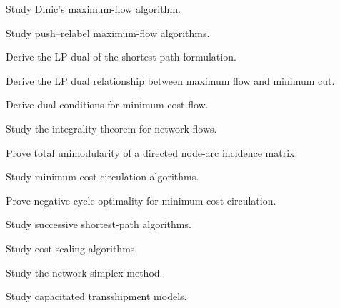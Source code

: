 \begin{exercise}[4]
Study Dinic's maximum-flow algorithm.
\end{exercise}

\begin{exercise}[4]
Study push--relabel maximum-flow algorithms.
\end{exercise}

\begin{exercise}[4]
Derive the LP dual of the shortest-path formulation.
\end{exercise}

\begin{exercise}[4]
Derive the LP dual relationship between maximum flow and minimum cut.
\end{exercise}

\begin{exercise}[4]
Derive dual conditions for minimum-cost flow.
\end{exercise}

\begin{exercise}[4]
Study the integrality theorem for network flows.
\end{exercise}

\begin{exercise}[4]
Prove total unimodularity of a directed node-arc incidence matrix.
\end{exercise}

\begin{exercise}[4]
Study minimum-cost circulation algorithms.
\end{exercise}

\begin{exercise}[4]
Prove negative-cycle optimality for minimum-cost circulation.
\end{exercise}

\begin{exercise}[4]
Study successive shortest-path algorithms.
\end{exercise}

\begin{exercise}[4]
Study cost-scaling algorithms.
\end{exercise}

\begin{exercise}[4]
Study the network simplex method.
\end{exercise}

\begin{exercise}[4]
Study capacitated transshipment models.
\end{exercise}

